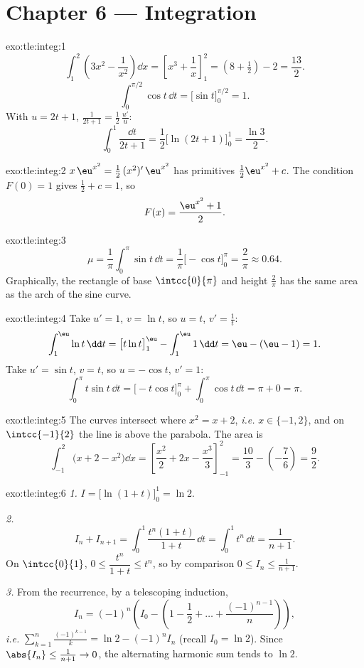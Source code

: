 \section*{Chapter 6 --- Integration}

\begin{solution}{exo:tle:integ:1}
\[
\int_1^2 \left(3x^2 - \frac{1}{x^2}\right)\dd x
= \left[x^3 + \frac1x\right]_1^2 = \left(8 + \tfrac12\right) - 2 = \frac{13}{2}.
\]
\[
\int_0^{\pi/2} \cos t\,\dd t = \bigl[\sin t\bigr]_0^{\pi/2} = 1 .
\]
With $u = 2t+1$, $\frac{1}{2t+1} = \frac12\,\frac{u'}{u}$:
\[
\int_0^1 \frac{\dd t}{2t+1} = \frac12\bigl[\ln(2t+1)\bigr]_0^1
= \frac{\ln 3}{2}.
\]
\end{solution}

\begin{solution}{exo:tle:integ:2}
$x\,\eu^{x^2} = \frac12\,(x^2)'\,\eu^{x^2}$ has primitives
$\frac12\eu^{x^2} + c$. The condition $F(0) = 1$ gives $\frac12 + c = 1$,
so
\[
F(x) = \frac{\eu^{x^2} + 1}{2}.
\]
\end{solution}

\begin{solution}{exo:tle:integ:3}
\[
\mu = \frac{1}{\pi}\int_0^\pi \sin t\,\dd t
= \frac{1}{\pi}\bigl[-\cos t\bigr]_0^\pi = \frac{2}{\pi} \approx 0.64 .
\]
Graphically, the rectangle of base $\intcc{0}{\pi}$ and height
$\frac{2}{\pi}$ has the same area as the arch of the sine curve.
\end{solution}

\begin{solution}{exo:tle:integ:4}
Take $u' = 1$, $v = \ln t$, so $u = t$, $v' = \frac1t$:
\[
\int_1^{\eu} \ln t\,\dd t = \bigl[t\ln t\bigr]_1^{\eu} - \int_1^{\eu} 1\,\dd t
= \eu - (\eu - 1) = 1 .
\]
Take $u' = \sin t$, $v = t$, so $u = -\cos t$, $v' = 1$:
\[
\int_0^\pi t\sin t\,\dd t = \bigl[-t\cos t\bigr]_0^\pi + \int_0^\pi \cos t\,\dd t
= \pi + 0 = \pi .
\]
\end{solution}

\begin{solution}{exo:tle:integ:5}
The curves intersect where $x^2 = x + 2$, \emph{i.e.} $x \in \{-1, 2\}$, and
on $\intcc{-1}{2}$ the line is above the parabola. The area is
\[
\int_{-1}^{2} \bigl(x + 2 - x^2\bigr)\dd x
= \left[\frac{x^2}{2} + 2x - \frac{x^3}{3}\right]_{-1}^{2}
= \frac{10}{3} - \left(-\frac{7}{6}\right) = \frac{9}{2}.
\]
\end{solution}

\begin{solution}{exo:tle:integ:6}
\emph{1.} $I = \bigl[\ln(1+t)\bigr]_0^1 = \ln 2$.

\emph{2.}
\[
I_n + I_{n+1} = \int_0^1 \frac{t^n(1 + t)}{1+t}\,\dd t
= \int_0^1 t^n \,\dd t = \frac{1}{n+1}.
\]
On $\intcc{0}{1}$, $0 \leq \dfrac{t^n}{1+t} \leq t^n$, so by comparison
$0 \leq I_n \leq \frac{1}{n+1}$.

\emph{3.} From the recurrence, by a telescoping induction,
\[
I_n = (-1)^n\left(I_0 - \left(1 - \frac12 + \dots + \frac{(-1)^{n-1}}{n}\right)\right),
\]
\emph{i.e.}
$\displaystyle\sum_{k=1}^{n} \frac{(-1)^{k-1}}{k} = \ln 2 - (-1)^n I_n$
(recall $I_0 = \ln 2$). Since $\abs{I_n} \leq \frac{1}{n+1} \to 0$, the
alternating harmonic sum tends to $\ln 2$.
\end{solution}

